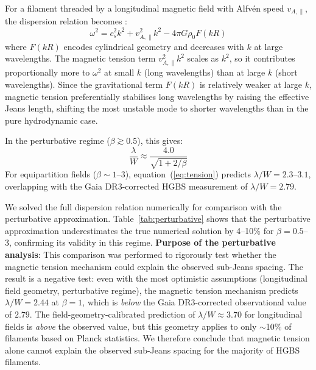 \documentclass[twoside,twocolumn]{mnras}
\begin{document}
For a filament threaded by a longitudinal magnetic field with Alfv\'en speed $v_{A,\parallel}$, the dispersion relation becomes \citep{Nakamura1993}:
\begin{equation}
\omega^2 = c_s^2 k^2 + v_{A,\parallel}^2 k^2 - 4\pi G\rho_0 F(kR)
\label{eq:dispersion}
\end{equation}
where $F(kR)$ encodes cylindrical geometry and decreases with $k$ at large wavelengths. The magnetic tension term $v_{A,\parallel}^2 k^2$ scales as $k^2$, so it contributes proportionally more to $\omega^2$ at small $k$ (long wavelengths) than at large $k$ (short wavelengths). Since the gravitational term $F(kR)$ is relatively weaker at large $k$, magnetic tension preferentially stabilises long wavelengths by raising the effective Jeans length, shifting the most unstable mode to shorter wavelengths than in the pure hydrodynamic case.

In the perturbative regime ($\beta \gtrsim 0.5$), this gives:
\begin{equation}
\frac{\lambda}{W} \approx \frac{4.0}{\sqrt{1 + 2/\beta}}
\label{eq:tension}
\end{equation}
For equipartition fields ($\beta \sim 1$--$3$), equation~(\ref{eq:tension}) predicts $\lambda/W = 2.3$--$3.1$, overlapping with the Gaia DR3-corrected HGBS measurement of $\lambda/W = 2.79$.

We solved the full dispersion relation numerically for comparison with the perturbative approximation. Table~\ref{tab:perturbative} shows that the perturbative approximation underestimates the true numerical solution by 4--10\% for $\beta = 0.5$--$3$, confirming its validity in this regime. \textbf{Purpose of the perturbative analysis}: This comparison was performed to rigorously test whether the magnetic tension mechanism could explain the observed sub-Jeans spacing. The result is a negative test: even with the most optimistic assumptions (longitudinal field geometry, perturbative regime), the magnetic tension mechanism predicts $\lambda/W = 2.44$ at $\beta = 1$, which is {\it below} the Gaia DR3-corrected observational value of $2.79$. The field-geometry-calibrated prediction of $\lambda/W \approx 3.70$ for longitudinal fields is {\it above} the observed value, but this geometry applies to only $\sim$10\% of filaments based on Planck statistics. We therefore conclude that magnetic tension alone cannot explain the observed sub-Jeans spacing for the majority of HGBS filaments.
\end{document}
